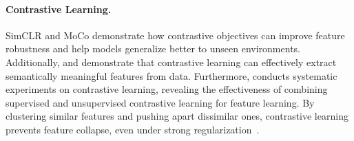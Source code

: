 \paragraph{Contrastive Learning.} 
SimCLR\citep{chen2020simple} and MoCo\citep{he2020momentum} demonstrate how contrastive objectives can improve feature robustness and help models generalize better to unseen environments. Additionally, \citep{wen2021toward} and \citep{ji2023power} demonstrate that contrastive learning can effectively extract semantically meaningful features from data. Furthermore, \citep{xue2023features} conducts systematic experiments on contrastive learning, revealing the effectiveness of combining supervised and unsupervised contrastive learning for feature learning.
By clustering similar features and pushing apart dissimilar ones, contrastive learning prevents feature collapse, even under strong regularization~\citep{ciga,cnc}. 



